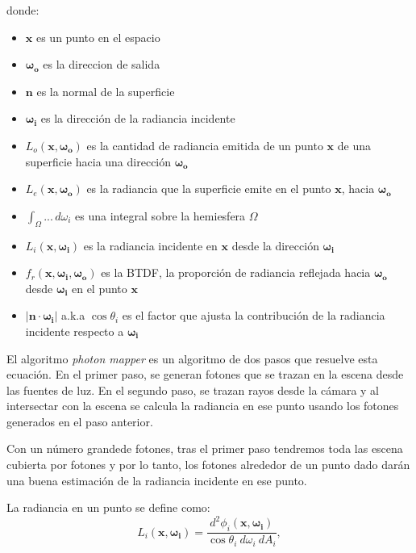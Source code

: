 \documentclass{article}
\begin{document}
donde:
\begin{itemize}
  \item \(\mathbf{x}\) es un punto en el espacio
  \item \(\mathbf{\omega_{o}}\) es la direccion de salida
  \item \(\mathbf{n}\) es la normal de la superficie
  \item \(\mathbf{\omega_{i}}\) es la dirección de la radiancia incidente
  \item \(L_o(\mathbf{x}, \mathbf{\omega_{o}})\) es la cantidad de radiancia emitida de un punto \(\mathbf{x}\) de una superficie hacia una dirección \(\mathbf{\omega_{o}}\)
  \item \(L_e(\mathbf{x}, \mathbf{\omega_{o}})\) es la radiancia que la superficie emite en el punto \(\mathbf{x}\), hacia \(\mathbf{\omega_{o}}\)
  \item \(\int_{\Omega} ... \, d\omega_{i}\) es una integral sobre la hemiesfera \(\Omega\)
  \item \(L_i(\mathbf{x}, \mathbf{\omega_{i}}) \) es la radiancia incidente en \(\mathbf{x}\) desde la dirección \(\mathbf{\omega_{i}}\)
  \item \(f_r(\mathbf{x}, \mathbf{\omega_{i}}, \mathbf{\omega_{o}}) \) es la BTDF, la proporción de radiancia reflejada hacia \(\mathbf{\omega_{o}}\) desde \(\mathbf{\omega_{i}}\) en el punto \(\mathbf{x}\)
  \item \(|\mathbf{n} \cdot \mathbf{\omega_{i}}|\) a.k.a \(\cos\theta_{i}\) es el factor que ajusta la contribución de la radiancia incidente respecto a \(\mathbf{\omega_{i}}\)
\end{itemize}

El algoritmo \textit{photon mapper} es un algoritmo de dos pasos que resuelve
esta ecuación. En el primer paso, se generan fotones que se trazan en la escena
desde las fuentes de luz. En el segundo paso, se trazan rayos desde la cámara y
al intersectar con la escena se calcula la radiancia en ese punto usando los
fotones generados en el paso anterior.

Con un número grandede fotones, tras el primer paso tendremos toda las escena
cubierta por fotones y por lo tanto, los fotones alrededor de un punto dado
darán una buena estimación de la radiancia incidente en ese punto.

La radiancia en un punto se define como:
\begin{equation} 
  L_i(\mathbf{x}, \mathbf{\omega_{i}}) = \frac{d^{2}\phi_{i}(\mathbf{x}, \mathbf{\omega_{i}})}{\cos\theta_{i} \: d\omega_{i} \: dA_{i}},
\end{equation}
\end{document}
